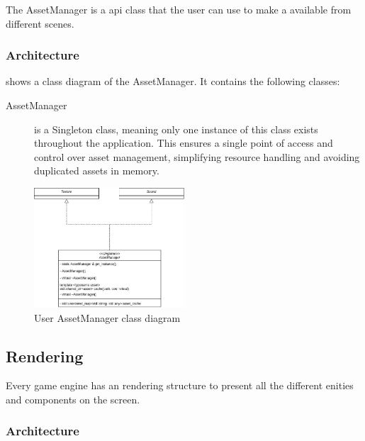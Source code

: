 \documentclass{projdoc}
\begin{document}
The AssetManager is a \gls{api} class that the user can use to make a
 available from different scenes.

\subsubsection{Architecture}

 shows a class diagram of the AssetManager. It contains
the following classes:\noparbreak
\begin{description}
	\item[AssetManager] is a Singleton class, meaning only one instance of this class
		exists throughout the application. This ensures a single point of access and
		control over asset management, simplifying resource handling and avoiding
		duplicated assets in memory.
\end{description}

\begin{figure}
	\centering
	\includegraphics[width=0.5\textwidth]{img/AssesManager.png}
	\caption{User AssetManager class diagram}
	\label{fig:class-assetmanager}
\end{figure}

\subsection{Rendering}

Every game engine has an rendering structure to present all the different enities and
components on the screen.

\subsubsection{Architecture}
\end{document}
